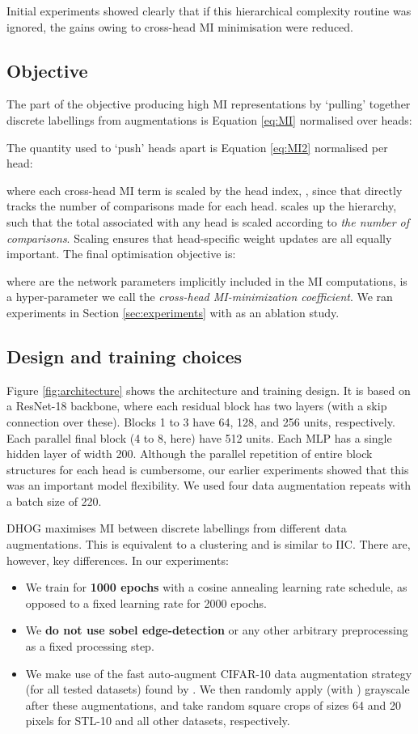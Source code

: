 \documentclass[runningheads]{llncs}
\begin{document}
Initial experiments showed clearly that if this hierarchical complexity routine was ignored, the gains owing to cross-head MI minimisation were reduced. 

\subsection{Objective}
The part of the objective producing high MI representations by `pulling' together discrete labellings from augmentations is Equation \ref{eq:MI} normalised over  heads:

The quantity used to `push' heads apart is Equation \ref{eq:MI2} normalised per head:

where each cross-head MI term is scaled by the head index, , since that directly tracks the number of comparisons made for each head.  scales up the hierarchy, such that the total  associated with any head is scaled according to \emph{the number of comparisons}. Scaling ensures that head-specific weight updates are all equally important. The final optimisation objective is:




where  are the network parameters implicitly included in the MI computations,  is a hyper-parameter we call the \textit{cross-head MI-minimization coefficient}. We ran experiments in Section \ref{sec:experiments} with  as an ablation study.


\subsection{Design and training choices}\label{sec:archchoice}

Figure \ref{fig:architecture} shows the architecture and training design. It is based on a ResNet-18 backbone, where each residual block has two layers (with a skip connection over these). Blocks 1 to 3 have 64, 128, and 256 units, respectively. Each parallel final block (4 to 8, here) have 512 units. Each MLP has a single hidden layer of width 200. Although the parallel repetition of entire block structures for each head is cumbersome, our earlier experiments showed that this was an important model flexibility. We used four data augmentation repeats with a batch size of 220.

DHOG maximises MI between discrete labellings from different data augmentations. This is equivalent to a clustering and is similar to IIC. There are, however, key differences. In our experiments:
\begin{itemize}
\item We train for \textbf{1000 epochs} with a cosine annealing learning rate schedule, as opposed to a fixed learning rate for 2000 epochs.
    \item We \textbf{do not use sobel edge-detection} or any other arbitrary preprocessing as a fixed processing step.
    \item We make use of the fast auto-augment CIFAR-10 data augmentation strategy (for all tested datasets) found by \cite{lim2019fast}. We then randomly apply (with ) grayscale after these augmentations, and take random square crops of sizes 64 and 20 pixels for STL-10 and all other datasets, respectively.
\end{itemize}{}
\end{document}
